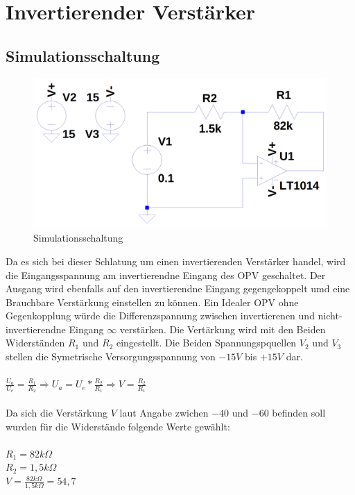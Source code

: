 
\section{Invertierender Verst\"arker}
\subsection{Simulationsschaltung}
\begin{figure}[H]
  \begin{center}
    \includegraphics[width=1\textwidth]{./Schaltungen/InvertierenderVerstaerker.png}
    \caption{Simulationsschaltung}
  \end{center}
\end{figure}
\noindent
Da es sich bei dieser Schlatung um einen invertierenden Verst\"arker handel, wird die Eingangsspannung am invertierendne Eingang des OPV geschaltet.
Der Ausgang wird ebenfalls auf den invertierendne Eingang gegengekoppelt umd eine Brauchbare Verst\"arkung einstellen zu k\"onnen. Ein Idealer OPV ohne Gegenkopplung w\"urde die Differenzspannung zwischen invertierenen und nicht-invertierendne Eingang $\infty$ verst\"arken. Die Vert\"arkung wird mit den Beiden Widerst\"anden $R_1$ und $R_2$ eingestellt. Die Beiden Spannungspquellen $V_2$ und $V_3$ stellen die Symetrische Versorgungsspannung von $-15V$ bis $+15V$ dar.\\ \\
$\frac{U_a}{U_e}=\frac{R_1}{R_2} \Rightarrow U_a=U_e*\frac{R_2}{R_1} \Rightarrow V=\frac{R_2}{R_1}$ \\ \\
Da sich die Verst\"arkung $V$ laut Angabe zwichen $-40$ und $-60$ befinden soll wurden f\"ur die Widerst\"ande folgende Werte gew\"ahlt: \\ \\
$R_1=82k\Omega$ \\
$R_2=1,5k\Omega$ \\
$V=\frac{82k \Omega}{1,5k\Omega}=54,7$

